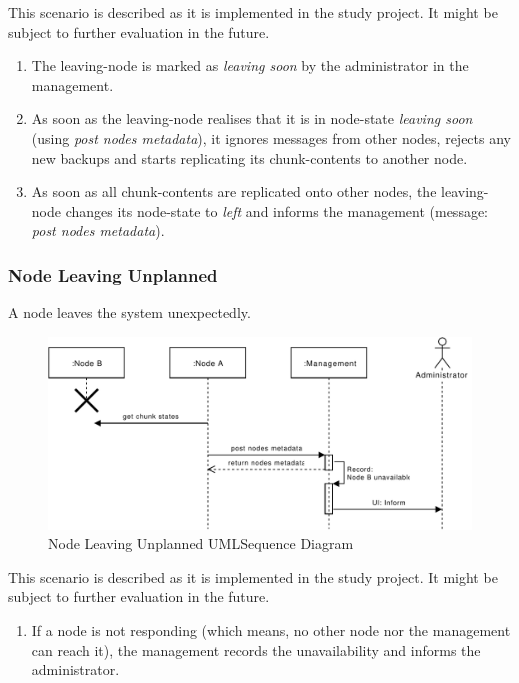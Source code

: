 This scenario is described as it is implemented in the study project. It might be subject to further evaluation in the future.

\begin{enumerate}
    \item The \gls{leaving-node} is marked as \emph{leaving soon} by the \gls{administrator} in the \gls{management}.
    \item As soon as the \gls{leaving-node} realises that it is in \gls{node-state} \emph{leaving soon} (using \emph{post nodes metadata}), it ignores messages from other \glspl{node}, rejects any new backups and starts replicating its \glspl{chunk-content} to another \gls{node}.
    \item As soon as all \glspl{chunk-content} are replicated onto other \glspl{node}, the \gls{leaving-node} changes its \gls{node-state} to \emph{left} and informs the \gls{management} (message: \emph{post nodes metadata}).
\end{enumerate}

\subsubsection{Node Leaving Unplanned}\label{sec:scenario-node-leave-unplanned}
A \gls{node} leaves the \gls{system} unexpectedly.

\begin{figure}[h]
    \centering
    \includegraphics[width=\linewidth]{resources/node_leaving_unplanned.pdf}
    \caption{Node Leaving Unplanned UMLSequence Diagram}
    \label{fig:node-leave-unplanned}
\end{figure}

This scenario is described as it is implemented in the study project. It might be subject to further evaluation in the future.

\begin{enumerate}
    \item If a \gls{node} is not responding (which means, no other \gls{node} nor the \gls{management} can reach it), the \gls{management} records the unavailability and informs the \gls{administrator}.
\end{enumerate}

